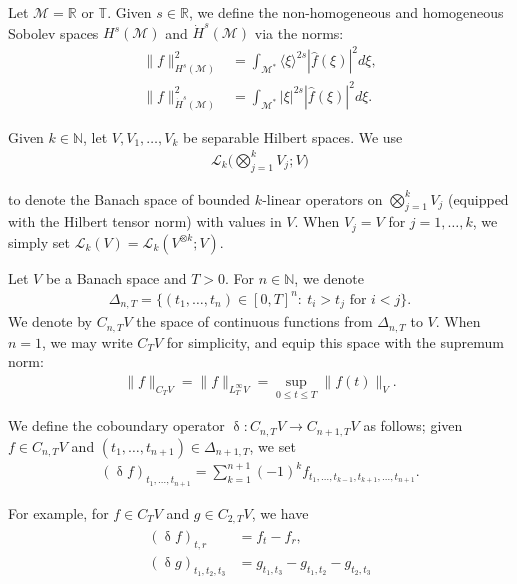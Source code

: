 \documentclass[letterpaper, 11pt,  reqno]{amsart}
\newcommand{\1}{\hspace{0.5mm}\text{I}\hspace{0.5mm}}
\newcommand{\noi}{\noindent}
\newcommand{\R}{\mathbb{R}}
\newcommand{\T}{\mathbb{T}}
\newcommand{\updl}{\updelta}
\newcommand{\Dl}{\Delta}
\newcommand{\ft}{\widehat}
\newcommand{\jb}[1]
{\langle #1 \rangle}
\newcommand{\M}{\mathcal{M}}
\newcommand{\N}{\mathbb{N}}
\newcommand{\cL}{\mathcal{L}}
\numberwithin{equation}{section}
\numberwithin{theorem}{section}
\begin{document}
Let $\M = \R$ or $\T$.
Given $s \in \R$, 
we define the non-homogeneous and homogeneous Sobolev spaces $H^{s}(\M)$ 
and $\dot H^{s}(\M)$ 
via the norms: 
\begin{align*}
\|  f  \|^2_{H^{s}(\M)}
& =
 \int_{\M^*} \jb{\xi}^{2s} |\ft f( \xi)|^2 d\xi, \\
\|  f  \|^2_{\dot H^{s}(\M)}
&  =
 \int_{\M^*} |\xi|^{2s} |\ft f( \xi)|^2 d\xi.
\end{align*}








Given $k \in \N$, 
let $V, V_1, \dots, V_k$  be separable Hilbert spaces.
We use 
\begin{align*}
\cL_k\Big(\bigotimes_{j = 1}^k V_j; V\Big)
\end{align*}

\noi
 to denote 
the Banach space of bounded $k$-linear operators 
on $\bigotimes_{j = 1}^k V_j$ 
(equipped with the Hilbert tensor norm) %
with values in $V$.
When $V_j =  V$ for $j =1, \dots,k$,
we simply set  
 $\cL_k(V)=\cL_k(V^{\otimes k}; V)$. 






Let $V$ be a Banach space and $T>0$.
For $n\in\N$, we denote 
\begin{align*}
\Delta_{n, T} = 
\big\{ (t_1, \ldots, t_n) \in [0,T]^n: \ t_i > t_j 
\text{ for } i < j\big\}.
\end{align*}
We denote by $C_{n,T}V$ 
the space of continuous functions 
from $\Delta_{n,T}$ to $V$. When $n=1$,
we may write $C_T V$ for simplicity, 
and equip this space with the supremum norm: 
\begin{align*}
\|f\|_{C_T V} = \|f\|_{L^\infty_T V} = \sup_{0\leq t \leq T} \|f(t)\|_V.
\end{align*}



\noi
We define the coboundary operator 
$\updl: C_{n,T} V  \to C_{n+1,T} V$ 
as follows; 
given  $f\in C_{n,T} V$ 
and $(t_1,\ldots, t_{n+1}) \in \Dl_{{n+1},T}$, 
we set
\begin{align*}
(\updl f)_{t_1,\ldots , t_{n+1}} = 
\sum_{k=1}^{n+1} (-1)^{k} f_{t_1, \ldots, t_{k-1}, t_{k+1}, \ldots, t_{n+1}}.
\end{align*}



\noi
For example, for $f\in C_T V$
and 
$g\in C_{2,T} V$, 
we have 
\begin{align}
\begin{split}
(\updl f )_{t,r} &= f_t - f_r, \\
(\updl g)_{t_1,t_2,t_3} &= 
g_{t_1,t_3} - g_{t_1,t_2} - g_{t_2,t_3}
\end{split}
\label{dl1}
\end{align}
\end{document}
